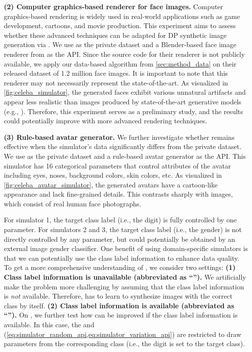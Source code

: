 \noindent\textbf{(2) Computer graphics-based renderer for face images.} Computer graphics-based rendering is widely used in real-world applications such as game development, cartoons, and movie production. This experiment aims to assess whether these advanced techniques can be adapted for DP synthetic image generation via \simpe{}. We use \celeba{} as the private dataset and a Blender-based face image renderer from \citet{bae2023digiface} as the API. Since the source code for their renderer is not publicly available, we apply our data-based algorithm from \cref{sec:method_data} on their released dataset of 1.2 million face images.
It is important to note that this renderer may not necessarily represent the state-of-the-art. As visualized in \cref{fig:celeba_simulator}, the generated faces exhibit various unnatural artifacts and appear less realistic than images produced by state-of-the-art generative models (e.g., \citet{rombach2022high}). Therefore, this experiment serves as a preliminary study, and the results could potentially improve with more advanced rendering techniques.

\noindent\textbf{(3) Rule-based avatar generator.} We further investigate whether \simpe{} remains effective when the simulator's data significantly differs from the private dataset. We use \celeba{} as the private dataset and a rule-based avatar generator \cite{pythonavatar} as the API. 
This simulator has 16 categorical parameters that control attributes of the avatar including eyes, noses, background colors, skin colors, etc.
As visualized in \cref{fig:celeba_avatar_simulator}, the generated avatars have a cartoon-like appearance and lack fine-grained details. This contrasts sharply with \celeba{} images, which consist of real human face photographs.

 For simulator 1, the target class label (i.e., the digit) is fully controlled by one parameter.
For simulators 2 and 3, the target class label (i.e., the gender) is not directly controlled by any parameter, but could potentially be obtained by an external image gender classifier.
One benefit of using domain-specific simulators is that we can potentially use the class label information to enhance data quality.
To get a more comprehensive understanding of \simpe{}, we consider two settings: \textbf{(1) Class label information is unavailable (abbreviated as ``\classunavail{}'').} We artificially make the problem more challenging by assuming that the class label information is \emph{not} available. Therefore, \simpe{} has to learn to synthesize images with the correct class by itself. \textbf{(2) Class label information is available  (abbreviated as ``\classavail{}'').} On \mnist{}, we further test how \simpe{} can be improved if the class label information is available. In this case, 
the \randomsampleapiname{} and \samplevariationapiname{} (\cref{eq:simulator_random_api,eq:simulator_variation_api}) are restricted to draw parameters from the corresponding class (i.e., the digit is set to the target class).



